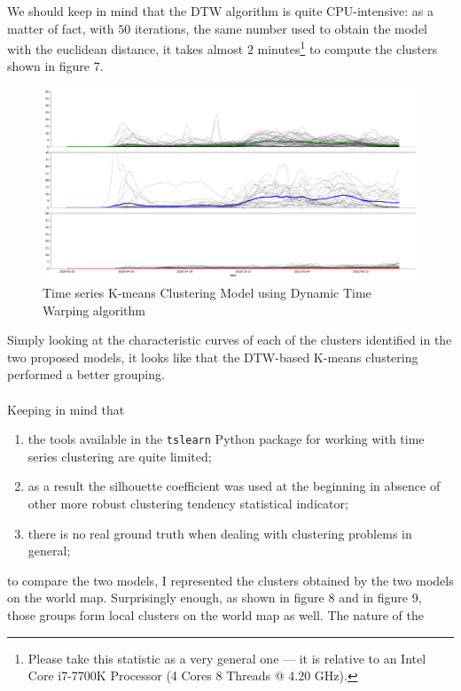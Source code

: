 \documentclass[11pt,a4paper]{article}
\begin{document}
We should keep in mind that the DTW algorithm is quite CPU-intensive: as a
matter of fact, with $50$ iterations, the same number used to obtain the model
with the euclidean distance, it takes almost $2$ minutes\footnote{Please take
this statistic as a very general one --- it is relative to an Intel Core
i7-7700K Processor (4 Cores 8 Threads @ 4.20 GHz).} to compute the clusters
shown in figure 7.
\begin{figure}[H]
    \begin{center}
        \includegraphics[scale=0.32]{img/daily-deaths-dtw-clusters.pdf}
    \end{center}
    \vspace{-0.3cm}
    \caption{Time series K-means Clustering Model using Dynamic Time Warping algorithm}
\end{figure}
\noindent
Simply looking at the characteristic curves of each of the clusters identified
in the two proposed models, it looks like that the DTW-based K-means clustering
performed a better grouping.\\
\\
Keeping in mind that
\begin{enumerate}
    \item the tools available in the \texttt{tslearn} Python package for working
    with time series clustering are quite limited;
    \item as a result the silhouette coefficient was used at the beginning in
    absence of other more robust clustering tendency statistical indicator;
    \item there is no real ground truth when dealing with clustering problems in
    general;
\end{enumerate}
to compare the two models, I represented the clusters obtained by the two models
on the world map. Surprisingly enough, as shown in figure 8 and in figure 9,
those groups form local clusters on the world map as well. The nature of the
\end{document}
